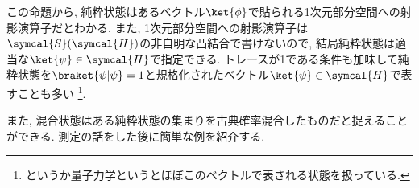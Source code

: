 この命題から, 純粋状態はあるベクトル$\ket{\phi}$で貼られる1次元部分空間への射影演算子だとわかる. 
また, 1次元部分空間への射影演算子は$\symcal{S}(\symcal{H})$の非自明な凸結合で書けないので, 結局純粋状態は適当な$\ket{\psi}\in\symcal{H}$で指定できる. 
トレースが1である条件も加味して純粋状態を$\braket{\psi|\psi}=1$と規格化されたベクトル$\ket{\psi}\in\symcal{H}$で表すことも多い
\footnote{というか量子力学というとほぼこのベクトルで表される状態を扱っている. }. 

また, 混合状態はある純粋状態の集まりを古典確率混合したものだと捉えることができる. 
測定の話をした後に簡単な例を紹介する. 







